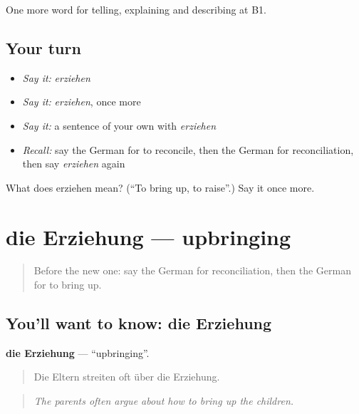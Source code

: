 \begin{grammarlens}[title={What you've built}]
One more word for telling, explaining and describing at B1.
\end{grammarlens}

\subsection*{Your turn}
\begin{itemize}
\raggedright
  \item \emph{Say it:} \emph{erziehen}
  \item \emph{Say it:} \emph{erziehen}, once more
  \item \emph{Say it:} a sentence of your own with \emph{erziehen}
  \item \emph{Recall:} say the German for to reconcile, then the German for reconciliation, then say \emph{erziehen} again
\end{itemize}

\begin{tcolorbox}[breakable,colback=teal!4,colframe=teal!35!black,title={Before you move on}]
What does erziehen mean? (\textquotedblleft{}To bring up, to raise\textquotedblright{}.) Say it once more.
\end{tcolorbox}
\section[die Erziehung]{die Erziehung — upbringing}

\label{lesson:GE-C495-erziehung}



\begin{quote}
Before the new one: say the German for reconciliation, then the German for to bring up.
\end{quote}

\subsection*{You'll want to know: die Erziehung}
\textbf{die Erziehung} — \textquotedblleft{}upbringing\textquotedblright{}.

\begin{quote}
Die Eltern streiten oft über die Erziehung.
\end{quote}

\begin{quote}
\emph{The parents often argue about how to bring up the children.}
\end{quote}

